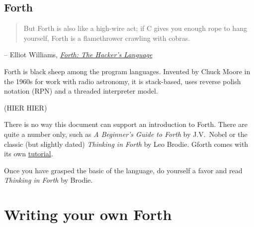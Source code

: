 \subsection{Forth}

\begin{quote}
        But Forth is also like a high-wire act; if C gives you enough rope to
        hang yourself, Forth is a flamethrower crawling with cobras.
\end{quote}
\begin{flushright}
        -- Elliot Williams, \href{https://hackaday.com/2017/01/27/forth-the-hackers-language/}{
        \textit{Forth: The Hacker's Language}}
\end{flushright}

Forth is black sheep among the program languages. Invented
by Chuck Moore in the 1960s for work with radio astronomy,
it is stack-based, uses reverse polish notation (RPN) and a threaded interpreter
model. 

(HIER HIER)

There is no way this document can support an introduction to Forth. There are
quite a number only, such as \textit{A Beginner's Guide to Forth} by
J.V.~Nobel\cite{nobel} or the classic (but slightly dated) \textit{Thinking in
Forth}\cite{brodie03} by Leo Brodie.  Gforth
comes with its own
\href{http://www.complang.tuwien.ac.at/forth/gforth/Docs-html/Tutorial.html}{tutorial}.

Once you have grasped the basic of the language, do yourself a favor and read
\textit{Thinking in Forth} by Brodie\cite{brodie84}. 


\section{Writing your own Forth}
